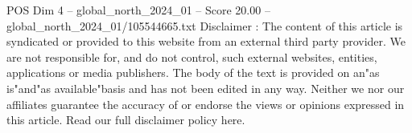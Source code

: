 \begin{textsample}{POS Dim 4 – global\_north\_2024\_01 – Score 20.00 – global\_north\_2024\_01/105544665.txt}
Disclaimer : The content of this article is syndicated or provided to this website from an external third party provider.
We are not responsible for, and do not control, such external websites, entities, applications or media publishers.
The body of the text is provided on an"as is"and"as available"basis and has not been edited in any way.
Neither we nor our affiliates guarantee the accuracy of or endorse the views or opinions expressed in this article.
Read our full disclaimer policy here.

\end{textsample}
